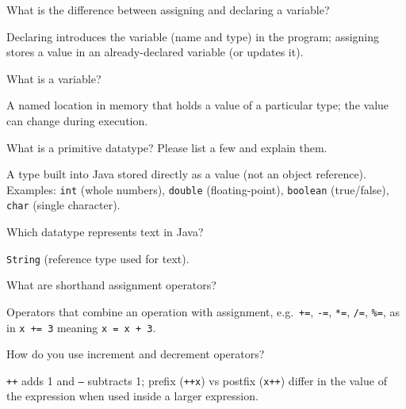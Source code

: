 


\question[4]
What is the difference between assigning and declaring a variable?
\begin{solutionorbox}[1.15in]
  Declaring introduces the variable (name and type) in the program; assigning stores a value in an already-declared variable (or updates it).
\end{solutionorbox}

\question[4]
What is a variable?
\begin{solutionorbox}[1in]
  A named location in memory that holds a value of a particular type; the value can change during execution.
\end{solutionorbox}

\question[4]
What is a primitive datatype? Please list a few and explain them.
\begin{solutionorbox}[1.6in]
  A type built into Java stored directly as a value (not an object reference). Examples: \texttt{int} (whole numbers), \texttt{double} (floating-point), \texttt{boolean} (true/false), \texttt{char} (single character).
\end{solutionorbox}

\newpage

\question[4]
Which datatype represents text in Java?
\begin{solutionorbox}[0.85in]
  \texttt{String} (reference type used for text).
\end{solutionorbox}

\question[4]
What are shorthand assignment operators?
\begin{solutionorbox}[1.1in]
  Operators that combine an operation with assignment, e.g.\ \texttt{+=}, \texttt{-=}, \texttt{*=}, \texttt{/=}, \texttt{\%=}, as in \texttt{x += 3} meaning \texttt{x = x + 3}.
\end{solutionorbox}

\question[4]
How do you use increment and decrement operators?
\begin{solutionorbox}[1.1in]
  \texttt{++} adds 1 and \texttt{--} subtracts 1; prefix (\texttt{++x}) vs postfix (\texttt{x++}) differ in the value of the expression when used inside a larger expression.
\end{solutionorbox}

